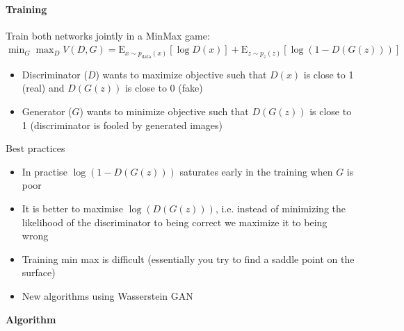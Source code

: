 \paragraph{Training}
\begin{minipage}{0.5\textwidth}
    Train both networks jointly in a MinMax game: \\$\min_G\max_D V(D,G) = \mathrm{E}_{x \sim p_\text{data}(x)}[\log D(x)] + \mathrm{E}_{z \sim p_z(z)}[\log(1-D(G(z)))]$

    \begin{itemize}
        \item Discriminator ($D$) wants to maximize objective such that $D(x)$ is close to 1 (real) and $D(G(z))$ is close to 0 (fake)
        \item Generator ($G$) wants to minimize objective such that $D(G(z))$ is close to 1 (discriminator is fooled by generated images)
    \end{itemize}
\end{minipage}
\begin{minipage}{0.5\textwidth}
    Best practices
    \begin{itemize}
        \item In practise $\log(1-D(G(z)))$ saturates early in the training when $G$ is poor
        \item It is better to maximise $\log(D(G(z)))$, i.e. instead of minimizing the likelihood of the discriminator to being correct we maximize it to being wrong
        \item Training min max is difficult (essentially you try to find a saddle point on the surface)
        \item New algorithms using Wasserstein GAN
    \end{itemize}
\end{minipage}
\textbf{Algorithm}
